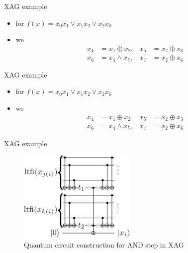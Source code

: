 \begin{frame}{XAG example}
  \begin{itemize}
    \item for $f(x)=x_0x_1\vee x_1x_2\vee x_2x_0$
    \item we 
    \begin{align}
      x_{4} & = x_{1} \oplus x_{2}, & x_{5} & = x_{2} \oplus x_{3} \\
      x_{6} & = x_{4} \wedge x_{5}, & x_{7} & = x_{2} \oplus x_{6}
    \end{align}
  \end{itemize}
\end{frame}
\begin{frame}{XAG example}
  \begin{itemize}
    \item for $f(x)=x_0x_1\vee x_1x_2\vee x_2x_0$
    \item we 
    \begin{align}
      x_{4} & = x_{1} \oplus x_{2}, & x_{5} & = x_{2} \oplus x_{3} \\
      x_{6} & = x_{4} \wedge x_{5}, & x_{7} & = x_{2} \oplus x_{6}
    \end{align}
  \end{itemize}
\end{frame}
\begin{frame}{XAG example}
  \begin{figure}[htbq]
    \centering
    \includegraphics[width=0.5\textwidth]{figure/construction.png}
    \caption{Quantum circuit construction for AND step in XAG} 
    \label{fig-XAG}
  \end{figure}
\end{frame}
